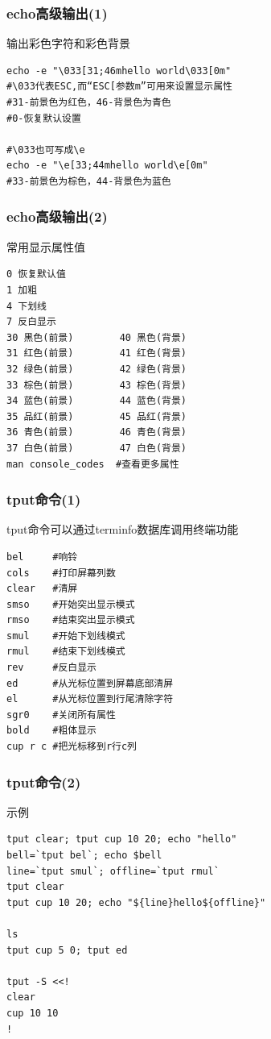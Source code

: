 \documentclass[xcolor=svgnames,presentation]{beamer}
\begin{document}
\begin{frame}[fragile]
\frametitle{echo高级输出(1)}
\label{sec-1-3-12}
\begin{exampleblock}{输出彩色字符和彩色背景}
\label{sec-1-3-12-1}


\begin{verbatim}
echo -e "\033[31;46mhello world\033[0m"
#\033代表ESC,而“ESC[参数m”可用来设置显示属性
#31-前景色为红色，46-背景色为青色
#0-恢复默认设置

#\033也可写成\e
echo -e "\e[33;44mhello world\e[0m"
#33-前景色为棕色，44-背景色为蓝色
\end{verbatim}
\end{exampleblock}
\end{frame}
\begin{frame}[fragile]
\frametitle{echo高级输出(2)}
\label{sec-1-3-13}
\begin{exampleblock}{常用显示属性值}
\label{sec-1-3-13-1}


\begin{verbatim}
0 恢复默认值
1 加粗
4 下划线
7 反白显示
30 黑色(前景)        40 黑色(背景)
31 红色(前景)        41 红色(背景)
32 绿色(前景)        42 绿色(背景)
33 棕色(前景)        43 棕色(背景)
34 蓝色(前景)        44 蓝色(背景)
35 品红(前景)        45 品红(背景)
36 青色(前景)        46 青色(背景)
37 白色(前景)        47 白色(背景)
man console_codes  #查看更多属性
\end{verbatim}
\end{exampleblock}
\end{frame}
\begin{frame}[fragile]
\frametitle{tput命令(1)}
\label{sec-1-3-14}
\begin{exampleblock}{tput命令可以通过terminfo数据库调用终端功能}
\label{sec-1-3-14-1}


\begin{verbatim}
bel     #响铃
cols    #打印屏幕列数
clear   #清屏
smso    #开始突出显示模式
rmso    #结束突出显示模式
smul    #开始下划线模式
rmul    #结束下划线模式
rev     #反白显示
ed      #从光标位置到屏幕底部清屏
el      #从光标位置到行尾清除字符
sgr0    #关闭所有属性
bold    #粗体显示
cup r c #把光标移到r行c列
\end{verbatim}
\end{exampleblock}
\end{frame}
\begin{frame}[fragile]
\frametitle{tput命令(2)}
\label{sec-1-3-15}
\begin{exampleblock}{示例}
\label{sec-1-3-15-1}


\begin{verbatim}
tput clear; tput cup 10 20; echo "hello"
bell=`tput bel`; echo $bell
line=`tput smul`; offline=`tput rmul`
tput clear
tput cup 10 20; echo "${line}hello${offline}"

ls
tput cup 5 0; tput ed

tput -S <<!
clear
cup 10 10
!
\end{verbatim}
\end{exampleblock}
\end{frame}
\end{document}
